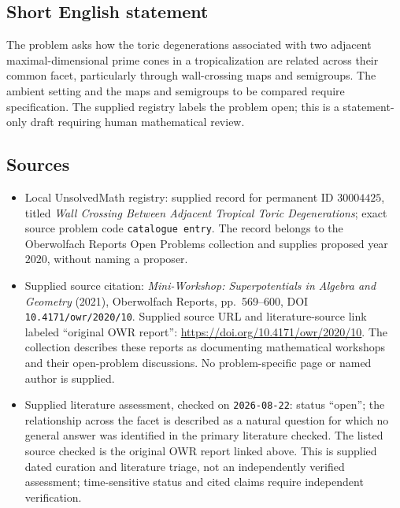 \documentclass[11pt]{article}
\begin{document}
\subsection{Short English statement}
The problem asks how the toric degenerations associated with two adjacent maximal-dimensional prime cones in a tropicalization are related across their common facet, particularly through wall-crossing maps and semigroups. The ambient setting and the maps and semigroups to be compared require specification. The supplied registry labels the problem open; this is a statement-only draft requiring human mathematical review.
\subsection{Sources}
\begin{itemize}
\item Local UnsolvedMath registry: supplied record for permanent ID \(30004425\), titled \emph{Wall Crossing Between Adjacent Tropical Toric Degenerations}; exact source problem code \texttt{catalogue entry}. The record belongs to the Oberwolfach Reports Open Problems collection and supplies proposed year \(2020\), without naming a proposer.
\item Supplied source citation: \emph{Mini-Workshop: Superpotentials in Algebra and Geometry} (2021), Oberwolfach Reports, pp.\ 569--600, DOI \texttt{10.4171/owr/2020/10}. Supplied source URL and literature-source link labeled ``original OWR report'': \url{https://doi.org/10.4171/owr/2020/10}. The collection describes these reports as documenting mathematical workshops and their open-problem discussions. No problem-specific page or named author is supplied.
\item Supplied literature assessment, checked on \texttt{2026-08-22}: status ``open''; the relationship across the facet is described as a natural question for which no general answer was identified in the primary literature checked. The listed source checked is the original OWR report linked above. This is supplied dated curation and literature triage, not an independently verified assessment; time-sensitive status and cited claims require independent verification.
\end{itemize}
\end{document}
